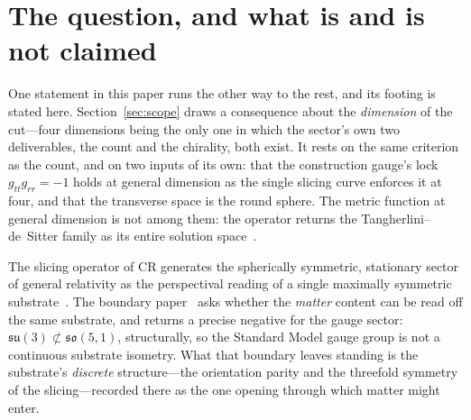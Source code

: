 \documentclass[11pt]{article}
\newcommand{\su}{\mathfrak{su}}
\newcommand{\so}{\mathfrak{so}}
\begin{document}
\begin{abstract}
The count is forced within CR by the programme's own criterion of necessity, not by an added axiom, and its footing is stated plainly: a framework declining that criterion reads the natural single-hinge index---one---not three. A further consequence is drawn in Section~\ref{sec:scope}, and it runs the other way to the rest of the paper: because the fold the count reads is $D-1$ in a $D$-dimensional cut, and because the horizon relation collapses to a single multiple-angle only at four and five dimensions while the mass-parity that grades chirality exists only in even dimension, four is the only dimension carrying both a generation count and a handedness. Within CR, and on the same footing as the rest, three generations and four-dimensional spacetime are one fact read at two ends.
\end{abstract}

\section{The question, and what is and is not claimed}\label{sec:intro}

One statement in this paper runs the other way to the rest, and its footing is stated here. Section~\ref{sec:scope} draws a consequence about the \emph{dimension} of the cut---four dimensions being the only one in which the sector's own two deliverables, the count and the chirality, both exist. It rests on the same criterion as the count, and on two inputs of its own: that the construction gauge's lock $g_{tt}g_{rr}=-1$ holds at general dimension as the single slicing curve enforces it at four, and that the transverse space is the round sphere. The metric function at general dimension is not among them: the operator returns the Tangherlini--de~Sitter family as its entire solution space~\cite{JanzenSlicing}.

The slicing operator of CR generates the spherically symmetric, stationary sector of general relativity as the perspectival reading of a single maximally symmetric substrate~\cite{JanzenOperator,JanzenCRframework,JanzenGeometricCore}. The boundary paper~\cite{JanzenBoundary} asks whether the \emph{matter} content can be read off the same substrate, and returns a precise negative for the gauge sector: $\su(3)\not\subset\so(5,1)$, structurally, so the Standard Model gauge group is not a continuous substrate isometry. What that boundary leaves standing is the substrate's \emph{discrete} structure---the orientation parity and the threefold symmetry of the slicing---recorded there as the one opening through which matter might enter.
\end{document}
